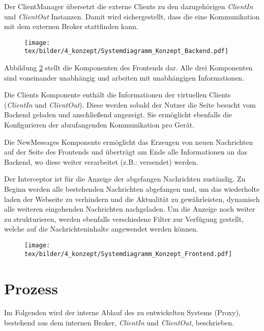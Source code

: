     Der ClientManager übersetzt die externe Clients zu den dazugehörigen \emph{ClientIn} und \emph{ClientOut} Instanzen. Damit wird sichergestellt, dass die eine Kommunikation mit dem externen Broker stattfinden kann.
    \begin{figure}[h]%
        \centering
        \texttt{[image: tex/bilder/4\_konzept/Systemdiagramm\_Konzept\_Backend.pdf]}
        \label{fig:system_backend}
    \end{figure}
    
    Abbildung \ref{fig:system_frontend} stellt die Komponenten des Frontends dar. Alle drei Komponenten sind voneinander unabhängig und arbeiten mit unabhängigen Informationen.
    
    Die Clients Komponente enthält die Informationen der virtuellen Clients (\emph{ClientIn} und \emph{ClientOut}). Diese werden sobald der Nutzer die Seite besucht vom Backend geladen und anschließend angezeigt. Sie ermöglicht ebenfalls die Konfigurieren der abzufangenden Kommunikation pro Gerät.
    
    Die NewMessages Komponente ermöglicht das Erzeugen von neuen Nachrichten auf der Seite des Frontends und überträgt am Ende alle Informationen an das Backend, wo diese weiter verarbeitet (z.B.: versendet) werden.
    
    Der Interceptor ist für die Anzeige der abgefangen Nachrichten zuständig. Zu Beginn werden alle bestehenden Nachrichten abgefangen und, um das wiederholte laden der Webseite zu verhindern und die Aktualität zu gewährleisten, dynamisch alle weiteren eingehenden Nachrichten nachgeladen. Um die Anzeige noch weiter zu strukturieren, werden ebenfalls verschiedene Filter zur Verfügung gestellt, welche auf die Nachrichteninhalte angewendet werden können.
    \begin{figure}[h]%
        \centering
        \texttt{[image: tex/bilder/4\_konzept/Systemdiagramm\_Konzept\_Frontend.pdf]}
        \label{fig:system_frontend}
    \end{figure}

\section{Prozess}
    Im Folgenden wird der interne Ablauf des zu entwickelten Systems (Proxy), bestehend aus dem internen Broker, \emph{ClientIn} und \emph{ClientOut}, beschrieben.


